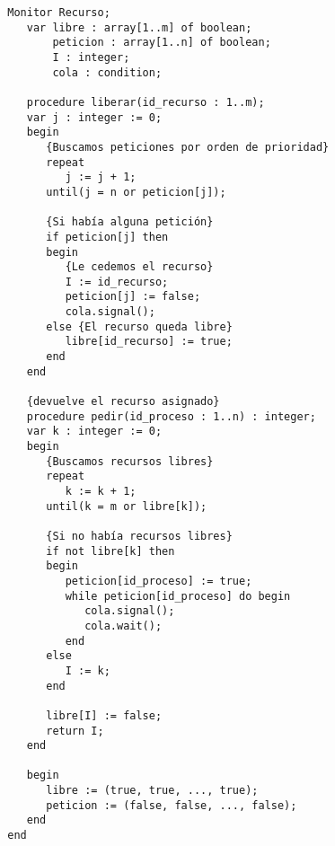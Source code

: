 \begin{ejercicio}
    \begin{verbatim}
        Monitor Recurso;
           var libre : array[1..m] of boolean;
               peticion : array[1..n] of boolean;
               I : integer;
               cola : condition;

           procedure liberar(id_recurso : 1..m);
           var j : integer := 0;
           begin
              {Buscamos peticiones por orden de prioridad}
              repeat
                 j := j + 1;
              until(j = n or peticion[j]);

              {Si había alguna petición}
              if peticion[j] then
              begin
                 {Le cedemos el recurso}
                 I := id_recurso;
                 peticion[j] := false;
                 cola.signal();
              else {El recurso queda libre}
                 libre[id_recurso] := true;
              end
           end

           {devuelve el recurso asignado}
           procedure pedir(id_proceso : 1..n) : integer;
           var k : integer := 0;
           begin
              {Buscamos recursos libres}
              repeat
                 k := k + 1;
              until(k = m or libre[k]);

              {Si no había recursos libres}
              if not libre[k] then
              begin
                 peticion[id_proceso] := true;
                 while peticion[id_proceso] do begin
                    cola.signal();
                    cola.wait();
                 end
              else
                 I := k;
              end

              libre[I] := false;
              return I;
           end

           begin
              libre := (true, true, ..., true);
              peticion := (false, false, ..., false);
           end
        end
    \end{verbatim}
\end{ejercicio}

